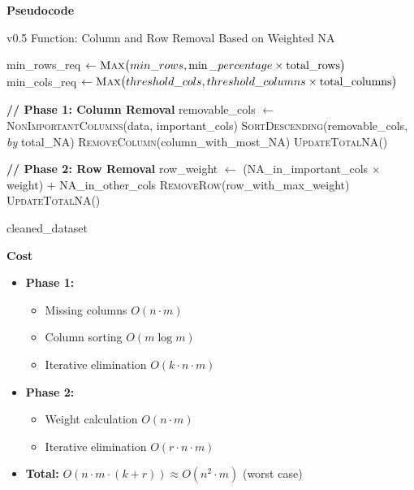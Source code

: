 \documentclass[a4paper,12pt]{article}
\begin{document}
\textbf{Pseudocode}
\begin{algorithm}[H]
\caption{v0.5 Function: Column and Row Removal Based on Weighted NA}
\begin{algorithmic}[1]
    \State min\_rows\_req $\gets \textsc{Max}\big(min\_rows, \min\_percentage \times \text{total\_rows}\big)$
    \State min\_cols\_req $\gets \textsc{Max}\big(threshold\_cols, \textstyle threshold\_columns \times \text{total\_columns}\big)$

    \State \textbf{// Phase 1: Column Removal}
    \State removable\_cols $\gets$ \textsc{NonImportantColumns}(data, important\_cols)
    \State \textsc{SortDescending}(removable\_cols, \textit{by} total\_NA)
        \State \textsc{RemoveColumn}(column\_with\_most\_NA)
        \State \textsc{UpdateTotalNA}()
    \EndWhile

    \State \textbf{// Phase 2: Row Removal}
        \State row\_weight $\gets$ (NA\_in\_important\_cols $\times$ weight) $+$ NA\_in\_other\_cols
        \State \textsc{RemoveRow}(row\_with\_max\_weight)
        \State \textsc{UpdateTotalNA}()
    \EndWhile

    \State \Return cleaned\_dataset
\EndFunction
\end{algorithmic}
\end{algorithm}

\textbf{Cost}
\begin{itemize}
    \item \textbf{Phase 1:} 
    \begin{itemize}
        \item Missing columns $O(n \cdot m)$ 
        \item Column sorting $O(m \log m)$
        \item Iterative elimination $O(k \cdot n \cdot m)$
    \end{itemize}
    \item \textbf{Phase 2:}
    \begin{itemize}
        \item Weight calculation $O(n \cdot m)$ 
        \item Iterative elimination $O(r \cdot n \cdot m)$
    \end{itemize}
    \item \textbf{Total:}  $O(n \cdot m \cdot (k + r)) \approx O(n^2 \cdot m)$ (worst case)
\end{itemize}
\end{document}
